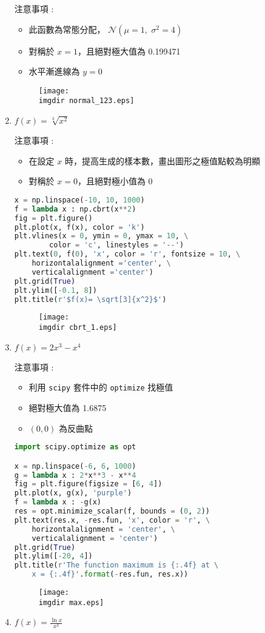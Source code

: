 \begin{enumerate}
注意事項 : 
\begin{itemize}
\item
此函數為常態分配， $\mathcal{N}(\mu = 1, \,\,\sigma^2 = 4)$
\item
對稱於 $x = 1$，且絕對極大值為 0.199471
\item
水平漸進線為 $y = 0$
\end{itemize}

\begin{figure}[H]
    \centering
        \texttt{[image: \\imgdir normal\_123.eps]}
\end{figure}
\item
$\displaystyle f(x) = \sqrt[3]{x^2}$
\vspace{0.2cm}

注意事項 : 
\begin{itemize}
\item
在設定 $x$ 時，提高生成的樣本數，畫出圖形之極值點較為明顯
\item
對稱於 $x = 0$，且絕對極小值為 0
\end{itemize}
\bigskip
\begin{lstlisting}[language = Python]
x = np.linspace(-10, 10, 1000)
f = lambda x : np.cbrt(x**2)
fig = plt.figure()
plt.plot(x, f(x), color = 'k')
plt.vlines(x = 0, ymin = 0, ymax = 10, \
		color = 'c', linestyles = '--')
plt.text(0, f(0), 'x', color = 'r', fontsize = 10, \
    horizontalalignment ='center', \
    verticalalignment ='center')
plt.grid(True)
plt.ylim([-0.1, 8])
plt.title(r'$f(x)= \sqrt[3]{x^2}$')
\end{lstlisting}
\begin{figure}[H]
    \centering
        \texttt{[image: \\imgdir cbrt\_1.eps]}
\end{figure}
\bigskip
\item
$f(x) = 2x^3 - x^4$

注意事項 : 
\begin{itemize}
\item
利用 \verb|scipy| 套件中的 \verb|optimize| 找極值
\item
絕對極大值為 1.6875
\item
$(0, 0)$ 為反曲點
\end{itemize}
\bigskip
\begin{lstlisting}[language = Python]
import scipy.optimize as opt

x = np.linspace(-6, 6, 1000)
g = lambda x : 2*x**3 - x**4
fig = plt.figure(figsize = [6, 4])
plt.plot(x, g(x), 'purple')
f = lambda x : -g(x)
res = opt.minimize_scalar(f, bounds = (0, 2))
plt.text(res.x, -res.fun, 'x', color = 'r', \
	horizontalalignment = 'center', \
	verticalalignment = 'center')
plt.grid(True)
plt.ylim([-20, 4])
plt.title(r'The function maximum is {:.4f} at \
	x = {:.4f}'.format(-res.fun, res.x))
\end{lstlisting}
\begin{figure}[H]
    \centering
        \texttt{[image: \\imgdir max.eps]}
\end{figure}
\item
$\displaystyle f(x) = \frac{\ln x}{x^3}$
\vspace{0.2cm}


\end{enumerate}
